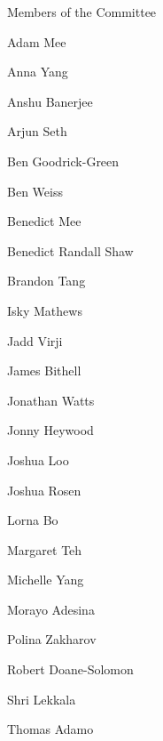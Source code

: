 \huge

Members of the Committee

\Large

\begin{paracol}{2}

\begin{flushright}
Adam Mee

Anna Yang

Anshu Banerjee

Arjun Seth

Ben Goodrick-Green

Ben Weiss

Benedict Mee

Benedict Randall Shaw

Brandon Tang

Isky Mathews

Jadd Virji

James Bithell

\end{flushright}

\switchcolumn

\begin{flushleft}
Jonathan Watts

Jonny Heywood

Joshua Loo

Joshua Rosen

Lorna Bo

Margaret Teh

Michelle Yang

Morayo Adesina

Polina Zakharov

Robert Doane-Solomon

Shri Lekkala

Thomas Adamo
\end{flushleft}

\end{paracol}